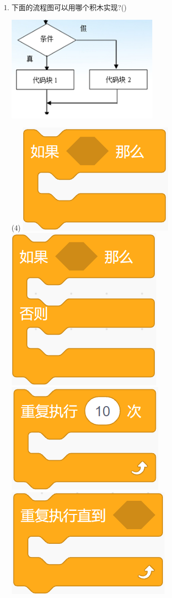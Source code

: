 \documentclass[10pt, a4paper]{article}
\begin{document}
\begin{enumerate}
        \item 下面的流程图可以用哪个积木实现?(\qquad)
        
        \begin{minipage}{.2\textwidth}
            \centering
            \includegraphics[width=\textwidth]{7.png}
        \end{minipage}
        \begin{minipage}{.74\textwidth}
            \centering
            \begin{tasks}(4)
                \task \includegraphics[width=.18\textwidth]{7a.png}
                \task \includegraphics[width=.13\textwidth]{7b.png}
                \task \includegraphics[width=.18\textwidth]{7c.png}
                \task \includegraphics[width=.18\textwidth]{7d.png}
            \end{tasks}
        \end{minipage}


\end{enumerate}
\end{document}
